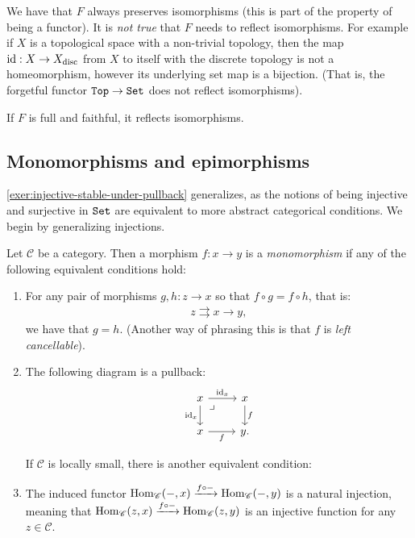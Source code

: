 \documentclass{article}[11pt]
\begin{document}
\begin{remark} We have that $F$ always preserves isomorphisms (this is part of the property of being a functor). It is \textit{not true} that $F$ needs to reflect isomorphisms. For example if $X$ is a topological space with a non-trivial topology, then the map $\text{id} : X \to X_{\text{disc}}$ from $X$ to itself with the discrete topology is not a homeomorphism, however its underlying set map is a bijection. (That is, the forgetful functor $\texttt{Top} \to \texttt{Set}$ does not reflect isomorphisms).
\end{remark}

\begin{exercise} If $F$ is full and faithful, it reflects isomorphisms.
\end{exercise}




\subsection{Monomorphisms and epimorphisms}

\autoref{exer:injective-stable-under-pullback} generalizes, as the notions of being injective and surjective in $\texttt{Set}$ are equivalent to more abstract categorical conditions. We begin by generalizing injections.

\begin{definition}\label{def:monomorphism} Let $\mathscr{C}$ be a category. Then a morphism $f: x \to y$ is a \textit{monomorphism} if any of the following equivalent conditions hold:
\begin{enumerate}
    \item For any pair of morphisms $g,h : z \to x$ so that $f\circ g = f\circ h$, that is:
    \begin{align*}
        z \rightrightarrows x \to y,
    \end{align*}
    we have that $g = h$. (Another way of phrasing this is that $f$ is \textit{left cancellable}).

    \item The following diagram is a pullback:
\[ \begin{tikzcd}
    x\rar["\id_x" above]\dar["\id_x" left]\pb & x\dar["f" right]\\
    x\rar["f" below] & y.
\end{tikzcd} \]

If $\mathscr{C}$ is locally small, there is another equivalent condition:
\end{enumerate}


\begin{enumerate}
\setcounter{enumi}{2}
    \item The induced functor $\textup{Hom}_\mathscr{C}(-,x) \xrightarrow{f\circ -} \textup{Hom}_\mathscr{C}(-,y)$ is a natural injection, meaning that $\textup{Hom}_\mathscr{C}(z,x) \xrightarrow{f\circ -} \textup{Hom}_\mathscr{C}(z,y)$ is an injective function for any $z\in \mathscr{C}$.
\end{enumerate}
\end{definition}
\end{document}
